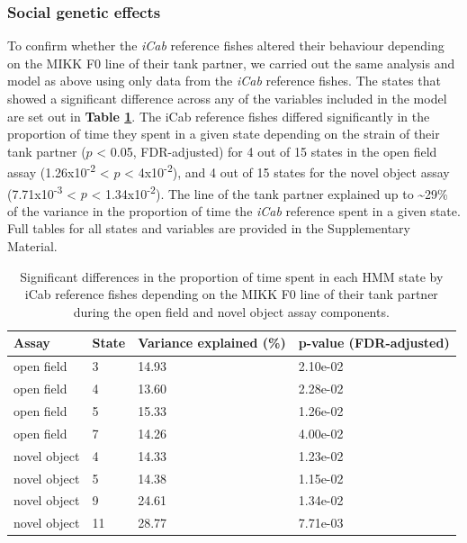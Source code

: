 \documentclass[
]{article}
\begin{document}
\hypertarget{social-genetic-effects-1}{%
\subsubsection{Social genetic effects}\label{social-genetic-effects-1}}

To confirm whether the \emph{\textcolor{iCab_424B4D}{iCab}} reference fishes altered their behaviour depending on the MIKK F0 line of their tank partner, we carried out the same analysis and model as above using only data from the \emph{\textcolor{iCab_424B4D}{iCab}} reference fishes. The states that showed a significant difference across any of the variables included in the model are set out in \textbf{Table \ref{tab:mikk-sge-F0}}. The iCab reference fishes differed significantly in the proportion of time they spent in a given state depending on the strain of their tank partner (\(p\) \textless{} 0.05, FDR-adjusted) for 4 out of 15 states in the open field assay (1.26x10\textsuperscript{-2} \textless{} \(p\) \textless{} 4x10\textsuperscript{-2}), and 4 out of 15 states for the novel object assay (7.71x10\textsuperscript{-3} \textless{} \(p\) \textless{} 1.34x10\textsuperscript{-2}). The line of the tank partner explained up to \textasciitilde29\% of the variance in the proportion of time the \emph{\textcolor{iCab_424B4D}{iCab}} reference spent in a given state. Full tables for all states and variables are provided in the Supplementary Material.

\begin{table}

\caption{\label{tab:mikk-sge-F0}Significant differences in the proportion of time spent in each HMM state by iCab reference fishes depending on the MIKK F0 line of their tank partner during the open field and novel object assay components.}
\centering
\begin{tabular}[t]{l|l|l|l}
\hline
Assay & State & Variance explained (\%) & p-value (FDR-adjusted)\\
\hline
open field & 3 & 14.93 & 2.10e-02\\
\hline
open field & 4 & 13.60 & 2.28e-02\\
\hline
open field & 5 & 15.33 & 1.26e-02\\
\hline
open field & 7 & 14.26 & 4.00e-02\\
\hline
novel object & 4 & 14.33 & 1.23e-02\\
\hline
novel object & 5 & 14.38 & 1.15e-02\\
\hline
novel object & 9 & 24.61 & 1.34e-02\\
\hline
novel object & 11 & 28.77 & 7.71e-03\\
\hline
\end{tabular}
\end{table}
\end{document}
